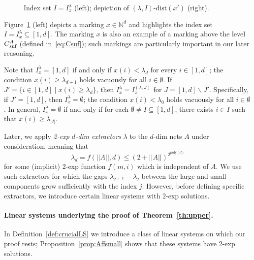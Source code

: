 \documentclass[11pt,a4paper]{amsart}
\newcommand{\dist}[3]{(#1,#2)\text{-dist}(#3)}
\newcommand{\nnorm}[1]{||#1||}
\newcommand{\suf}{{}_\textnormal{suf}}
\newcommand{\Nat}{\mathbb{N}}
\newcommand{\setN}{\Nat}
\newcommand*{\lastx}{}
\newcommand*{\lasty}{}
\newcommand{\drawconf}[5]{
    \xdef\lastx{#5}
    \foreach \y[count=\i] in {#3} {
        \ifnum \i = 1
            \draw[#1, #2] (\lastx,\y) -- (\lastx+#4,\y);
        \fi
        \ifnum \i > 1
            \draw[#1, #2] (\lastx,\lasty) -- (\lastx,\y);
            \draw[#1, #2] (\lastx,\y) -- (\lastx+#4,\y);
        \fi
        \xdef\lastx{\lastx+#4}
        \xdef\lasty{\y}
    }
}
\theoremstyle{plain}
\theoremstyle{definition}
\theoremstyle{defC}
\theoremstyle{thmC}
\begin{document}
\begin{figure}[t]
	\caption{Index set $I=I^\lambda_x$ (left);
	depiction of $\dist{\lambda}{I}{x'}$ (right).}\label{fig:extractor}
\end{figure}

Figure~\ref{fig:extractor} (left) depicts a marking $x\in\setN^d$
and highlights the index set $I=I^\lambda_x\subseteq[1,d]$. 
The marking $x$ is also an example of a marking 
above the level $C\suf^A$ (defined in~\eqref{eq:Csuf});
such markings are particularly important in our later reasoning.

Note that $I^\lambda_x=[1,d]$ if and only if $x(i)< \lambda_d$ for
every $i\in[1,d]$;
the condition  $x(i)\geq \lambda_{d+1}$ holds vacuously
for all $i\in\emptyset$.
If $J'=\{i\in[1,d]\mid x(i)\geq \lambda_d\}$, then 
$I^\lambda_x=I^{(\lambda,J)}_x$ for $J=[1,d]\smallsetminus J'$.
Specifically, if $J'=[1,d]$, then $I^\lambda_x=\emptyset$; the
condition
$x(i)<\lambda_{0}$ holds vacuously for all $i\in\emptyset$.
In general,  $I^\lambda_x=\emptyset$ if and only if for each
$\emptyset\neq I\subseteq[1,d]$, there exists $i\in I$ such that
$x(i)\geq \lambda_{|I|}$.

Later, we apply \emph{2-exp $d$-dim extractors} $\lambda$ to the $d$-dim nets $A$ under
consideration, meaning 
that 
\begin{equation*}
\lambda_d=f(\nnorm{A},d)\leq(2+\nnorm{A})^{2^{\text{poly}(d)}}
\end{equation*}
for some (implicit) 2-exp function $f(m,i)$ which is independent of $A$.
We use such extractors for which
the gaps $\lambda_{j+1}-\lambda_j$ between the large and small
components grow sufficiently with the index $j$.
However, before defining specific extractors, we introduce certain linear systems with
2-exp solutions.



\paragraph{Linear systems underlying the proof of Theorem~\ref{th:upper}.}
In Definition~\ref{def:crucialLS} we introduce a class of linear systems
on which our proof rests; Proposition~\ref{prop:Affsmall} shows that
these systems have 2-exp solutions.
\end{document}
